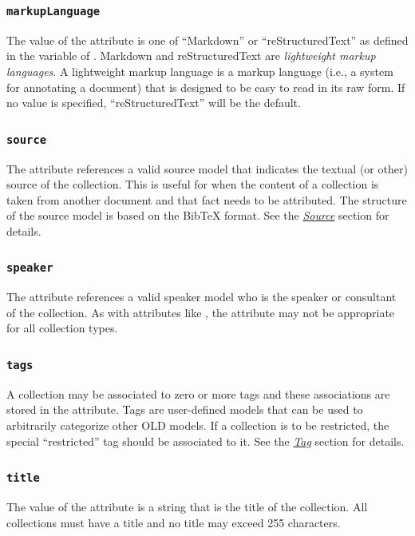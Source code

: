 \documentclass[letterpaper,10pt,english]{sphinxmanual}
\begin{document}
\subsubsection{\texttt{markupLanguage}}
\label{datastructure:markuplanguage}
The value of the  attribute is one of ``Markdown'' or
``reStructuredText'' as defined in the  variable of
.  Markdown and reStructuredText are \emph{lightweight markup
languages}.  A lightweight markup language is a markup language (i.e., a system
for annotating a document) that is designed to be easy to read in its raw form.
If no value is specified, ``reStructuredText'' will be the default.


\subsubsection{\texttt{source}}
\label{datastructure:source}
The  attribute references a valid source model that indicates the
textual (or other) source of the collection.  This is useful for when the
content of a collection is taken from another document and that fact needs to be
attributed.  The structure of the source model is based on the BibTeX format.
See the {\hyperref[datastructure:source-data-structure]{\emph{Source}}} section for details.


\subsubsection{\texttt{speaker}}
\label{datastructure:speaker}
The  attribute references a valid speaker model who is the speaker or
consultant of the collection.  As with attributes like , the
 attribute may not be appropriate for all collection types.


\subsubsection{\texttt{tags}}
\label{datastructure:tags}
A collection may be associated to zero or more tags and these associations are
stored in the  attribute.  Tags are user-defined models that can be used
to arbitrarily categorize other OLD models.  If a collection is to be
restricted, the special ``restricted'' tag should be associated to it.  See the
{\hyperref[datastructure:tag-data-structure]{\emph{Tag}}} section for details.


\subsubsection{\texttt{title}}
\label{datastructure:title}
The value of the  attribute is a string that is the title of the
collection.  All collections must have a title and no title may exceed 255
characters.
\end{document}
